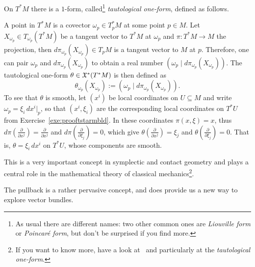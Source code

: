 \begin{example}
	On $T^*M$ there is a $1$-form, called\footnote{As usual there are different names: two other common ones are \emph{Liouville form} or \emph{Poincar\'e form}, but don't be surprised if you find more.} \emph{tautological one-form}, defined as follows.

	A point in $T^*M$ is a covector $\omega_p\in T^*_p M$ at some point $p\in M$. Let $X_{\omega_p}\in T_{\omega_p}(T^*M)$ be a tangent vector to $T^*M$ at $\omega_p$ and $\pi:T^*M \to M$ the projection, then $d\pi_{\omega_p}(X_{\omega_p})\in T_p M$ is a tangent vector to $M$ at $p$.
	Therefore, one can pair $\omega_p$ and $d\pi_{\omega_p}(X_{\omega_p})$ to obtain a real number $\left(\omega_p\;\big|\;d\pi_{\omega_p}(X_{\omega_p})\right)$.
	The tautological one-form $\theta\in\mathfrak{X}^*(T^*M)$ is then defined as
	\begin{equation}
		\theta_{\omega_p}(X_{\omega_p}) := \left(\omega_p\;\Big|\;d\pi_{\omega_p}(X_{\omega_p})\right).
	\end{equation}
	To see that $\theta$ is smooth, let $(x^i)$ be local coordinates on $U\subseteq M$ and write $\omega_p = \xi_i\, dx^i|_p$, so that $(x^i, \xi_i)$ are the corresponding local coordinates on $T^*U$ from Exercise~\ref{exe:prooftstarmbld}.
	In these coordinates $\pi(x,\xi) = x$, thus $d\pi\left(\frac{\partial}{\partial x^j}\right) = \frac{\partial}{\partial x^j}$ and $d\pi\left(\frac{\partial}{\partial \xi_j}\right) = 0$, which give $\theta\left(\frac{\partial}{\partial x^j}\right) = \xi_j$ and $\theta\left(\frac{\partial}{\partial \xi_j}\right) = 0$.
	That is, $\theta = \xi_i\, dx^i$ on $T^*U$, whose components are smooth.

	This is a very important concept in symplectic and contact geometry and plays a central role in the mathematical theory of classical mechanics\footnote{If you want to know more, have a look at~\cite[Sections 2.2 and 2.3]{book:cds} and particularly at the \emph{tautological one-form}.}.
\end{example}

The pullback is a rather pervasive concept, and does provide us a new way to explore vector bundles.

